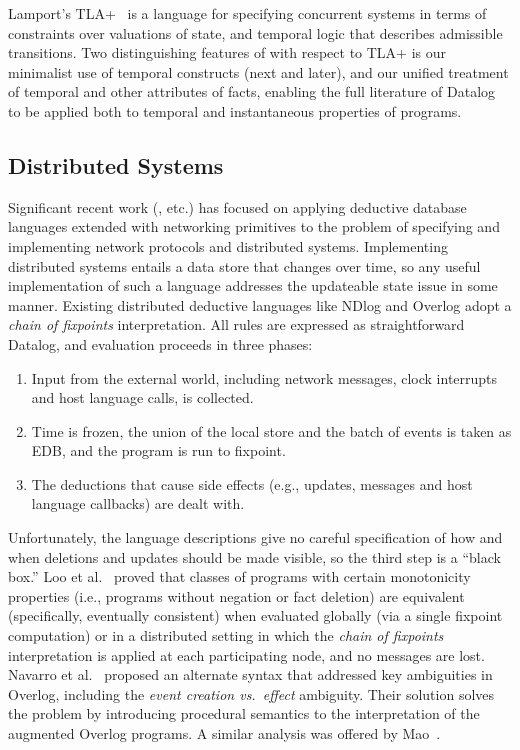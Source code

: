 Lamport's TLA+~\cite{tla} is a language for specifying 
concurrent systems in terms of constraints over valuations of state, and temporal logic that describes admissible transitions.  
Two distinguishing features of \lang with respect to TLA+ is our minimalist use of temporal constructs (next and later), and our unified treatment of temporal and other attributes of facts, enabling the full literature of Datalog to be applied both to temporal and instantaneous properties of programs.

\subsection{Distributed Systems}

Significant recent work (\cite{boom-techr,Belaramani:2009,Chu:2007,Loo2009-CACM}, etc.) has focused on applying deductive database languages extended with networking 
primitives to the problem of specifying and implementing network protocols and distributed systems.  Implementing distributed systems entails 
a data store that changes over time, so any useful implementation of such a language addresses the updateable state issue in some manner. 
Existing distributed deductive languages like NDlog and Overlog adopt a \emph{chain of fixpoints} interpretation.  All rules are expressed as 
straightforward Datalog, and evaluation proceeds in three phases:

\begin{enumerate}
\item Input from the external world, including network messages, clock interrupts and host language calls, is collected.
\item Time is frozen, the union of the local store and the batch of events is taken as EDB, and the program is run to fixpoint.
\item The deductions that cause side effects (e.g., updates, messages and host language callbacks) are dealt with.  
\end{enumerate}

Unfortunately, the language descriptions give no careful specification of how and when deletions and updates
should be made visible, so the third step is a ``black box.''  Loo et al.~\cite{loo-sigmod06} proved that classes of programs with certain 
monotonicity properties (i.e., programs without negation or fact deletion)
are equivalent (specifically, eventually consistent) when evaluated globally (via a single fixpoint computation) or in a distributed setting in which the 
\emph{chain of fixpoints} interpretation is applied at each participating node, and no messages are lost.
Navarro et al.~\cite{navarro} proposed an alternate syntax that addressed key ambiguities in Overlog, including the
\emph{event creation vs.\ effect} ambiguity.  Their solution solves the problem by introducing procedural semantics to the interpretation of 
the augmented Overlog programs.  A similar analysis was offered by Mao~\cite{Mao2009}.


